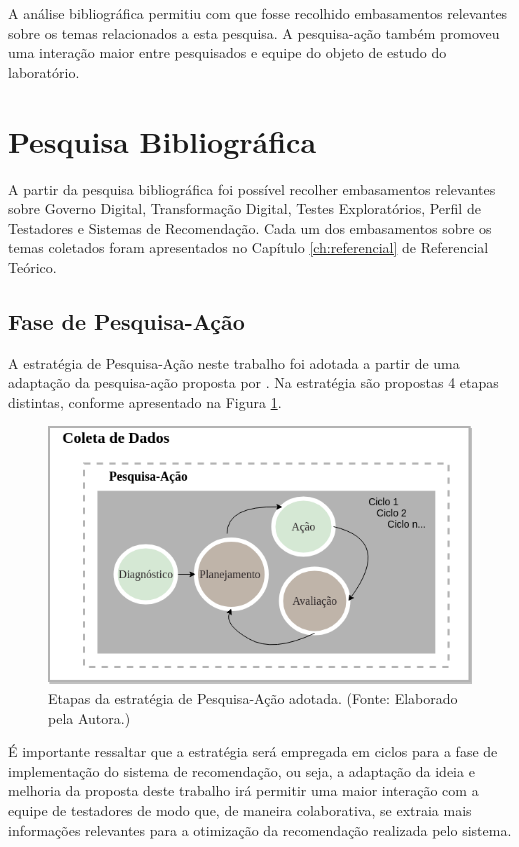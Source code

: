 A análise bibliográfica permitiu com que fosse recolhido embasamentos relevantes sobre os temas relacionados a esta pesquisa. A pesquisa-ação também promoveu uma interação maior entre pesquisados e equipe do objeto de estudo do laboratório.

\section{Pesquisa Bibliográfica}

A partir da pesquisa bibliográfica foi possível recolher embasamentos relevantes sobre Governo Digital, Transformação Digital, Testes Exploratórios, Perfil de Testadores e Sistemas de Recomendação. Cada um dos embasamentos sobre os temas coletados foram apresentados no Capítulo \ref{ch:referencial} de Referencial Teórico.

\subsection{Fase de Pesquisa-Ação}

A estratégia de Pesquisa-Ação neste trabalho foi adotada a partir de uma adaptação da pesquisa-ação proposta por \cite{petersen2008systematic}. Na estratégia são propostas 4 etapas distintas, conforme apresentado na Figura \ref{fig:etapasPesquisaAcao}.

        \begin{figure}[H]
          \centering
          \includegraphics[width=12cm]{figuras/etapasPesquisaAcao.png}
          \caption{Etapas da estratégia de Pesquisa-Ação adotada. (Fonte: Elaborado pela Autora.)} 
          \label{fig:etapasPesquisaAcao}
        
        \end{figure}
        
É importante ressaltar que a estratégia será empregada em ciclos para a fase de implementação do sistema de recomendação, ou seja, a adaptação da ideia e melhoria da proposta deste trabalho irá permitir uma maior interação com a equipe de testadores de modo que, de maneira colaborativa, se extraia mais informações relevantes para a otimização da recomendação realizada pelo sistema.

